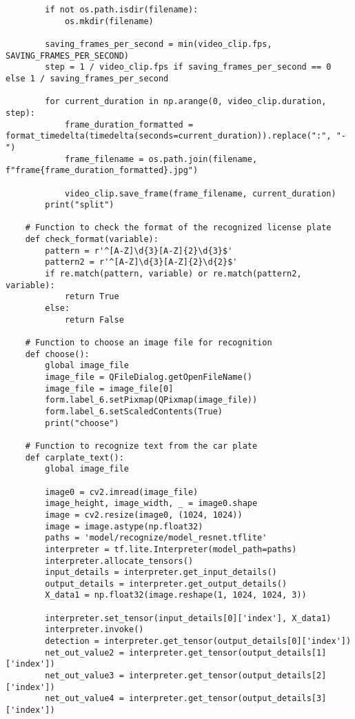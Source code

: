 \begin{lstlisting}
        if not os.path.isdir(filename):
            os.mkdir(filename)

        saving_frames_per_second = min(video_clip.fps, SAVING_FRAMES_PER_SECOND)
        step = 1 / video_clip.fps if saving_frames_per_second == 0 else 1 / saving_frames_per_second

        for current_duration in np.arange(0, video_clip.duration, step):
            frame_duration_formatted = format_timedelta(timedelta(seconds=current_duration)).replace(":", "-")
            frame_filename = os.path.join(filename, f"frame{frame_duration_formatted}.jpg")

            video_clip.save_frame(frame_filename, current_duration)
        print("split")

    # Function to check the format of the recognized license plate
    def check_format(variable):
        pattern = r'^[A-Z]\d{3}[A-Z]{2}\d{3}$'
        pattern2 = r'^[A-Z]\d{3}[A-Z]{2}\d{2}$'
        if re.match(pattern, variable) or re.match(pattern2, variable):
            return True
        else:
            return False

    # Function to choose an image file for recognition
    def choose():
        global image_file
        image_file = QFileDialog.getOpenFileName()
        image_file = image_file[0]
        form.label_6.setPixmap(QPixmap(image_file))
        form.label_6.setScaledContents(True)
        print("choose")

    # Function to recognize text from the car plate
    def carplate_text():
        global image_file

        image0 = cv2.imread(image_file)
        image_height, image_width, _ = image0.shape
        image = cv2.resize(image0, (1024, 1024))
        image = image.astype(np.float32)
        paths = 'model/recognize/model_resnet.tflite'
        interpreter = tf.lite.Interpreter(model_path=paths)
        interpreter.allocate_tensors()
        input_details = interpreter.get_input_details()
        output_details = interpreter.get_output_details()
        X_data1 = np.float32(image.reshape(1, 1024, 1024, 3))

        interpreter.set_tensor(input_details[0]['index'], X_data1)
        interpreter.invoke()
        detection = interpreter.get_tensor(output_details[0]['index'])
        net_out_value2 = interpreter.get_tensor(output_details[1]['index'])
        net_out_value3 = interpreter.get_tensor(output_details[2]['index'])
        net_out_value4 = interpreter.get_tensor(output_details[3]['index'])


\end{lstlisting}
